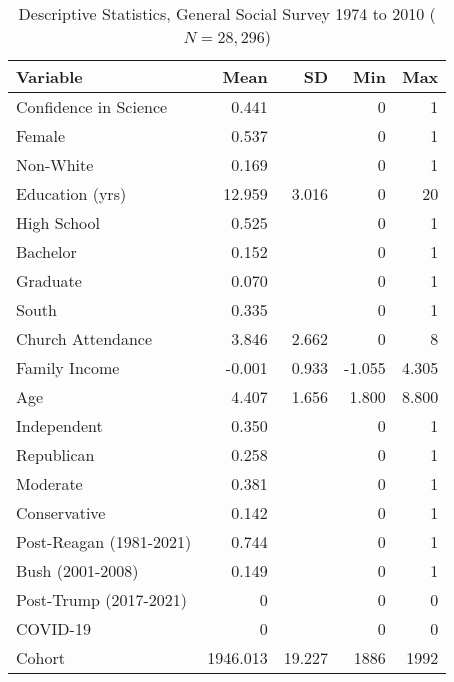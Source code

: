 \begin{table}[ht]
\centering
\caption{Descriptive Statistics, General Social Survey 1974 to 2010 ($N=28,296$)} 
\begin{tabularx}{\textwidth}{Xrrrr}
  \toprule
Variable & Mean & SD & Min & Max \\ 
  \midrule
Confidence in Science & 0.441 &  & 0 & 1 \\ 
  Female & 0.537 &  & 0 & 1 \\ 
  Non-White & 0.169 &  & 0 & 1 \\ 
  Education (yrs) & 12.959 & 3.016 & 0 & 20 \\ 
  High School & 0.525 &  & 0 & 1 \\ 
  Bachelor & 0.152 &  & 0 & 1 \\ 
  Graduate & 0.070 &  & 0 & 1 \\ 
  South & 0.335 &  & 0 & 1 \\ 
  Church Attendance & 3.846 & 2.662 & 0 & 8 \\ 
  Family Income & -0.001 & 0.933 & -1.055 & 4.305 \\ 
  Age & 4.407 & 1.656 & 1.800 & 8.800 \\ 
  Independent & 0.350 &  & 0 & 1 \\ 
  Republican & 0.258 &  & 0 & 1 \\ 
  Moderate & 0.381 &  & 0 & 1 \\ 
  Conservative & 0.142 &  & 0 & 1 \\ 
  Post-Reagan (1981-2021) & 0.744 &  & 0 & 1 \\ 
  Bush (2001-2008) & 0.149 &  & 0 & 1 \\ 
  Post-Trump (2017-2021) & 0 &  & 0 & 0 \\ 
  COVID-19 & 0 &  & 0 & 0 \\ 
  Cohort & 1946.013 & 19.227 & 1886 & 1992 \\ 
   \bottomrule
\end{tabularx}
\end{table}
